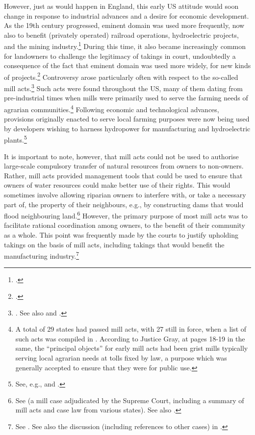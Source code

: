 However, just as would happen in England, this early US attitude would soon change in response to industrial advances and a desire for economic development. As the 19th century progressed, eminent domain was used more frequently, now also to benefit (privately operated) railroad operations, hydroelectric projects, and the mining industry.\footcite[23-33]{meidinger80} During this time, it also became increasingly common for landowners to challenge the legitimacy of takings in court, undoubtedly a consequence of the fact that eminent domain was used more widely, for new kinds of projects.\footcite[24]{meidinger80} Controversy arose particularly often with respect to the so-called mill acts.\footnote{\cite[24]{meidinger80}. See also \cite[306-313]{johnson11} and \cite[251-252]{horwitz73}.} Such acts were found throughout the US, many of them dating from pre-industrial times when mills were primarily used to serve the farming needs of agrarian communities.\footnote{A total of 29 states had passed mill acts, with 27 still in force, when a list of such acts was compiled in \cite[17]{head85}. According to Justice Gray, at pages 18-19 in the same, the ``principal objects'' for early mill acts had been grist mills typically serving local agrarian needs at tolls fixed by law, a purpose which was generally accepted to ensure that they were for public use.} Following economic and technological advances, provisions originally enacted to serve local farming purposes were now being used by developers wishing to harness hydropower for manufacturing and hydroelectric plants.\footnote{See, e.g., \cite[18-21]{head85} and \cite[449-452]{minn06}.}

It is important to note, however, that mill acts could not be used to  authorise large-scale compulsory transfer of natural resources from owners to non-owners. Rather, mill acts provided management tools that could be used to ensure that owners of water resources could make better use of their rights. This would sometimes involve allowing riparian owners to interfere with, or take a necessary part of, the property of their neighbours, e.g., by constructing dams that would flood neighbouring land.\footnote{See \cite{head85} (a mill case adjudicated by the Supreme Court, including a summary of mill acts and case law from various states). See also \cite[265]{staples03}.} However, the primary purpose of most mill acts was to facilitate rational coordination among owners, to the benefit of their community as a whole. This point was frequently made by the courts to justify upholding takings on the basis of mill acts, including takings that would benefit the manufacturing industry.\footnote{See \cite{fiske31}. See also the discussion (including references to other cases) in \cite{head85}.}

